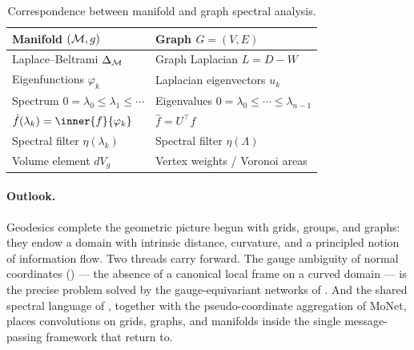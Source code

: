 \begin{table}[h]
\centering
\caption{Correspondence between manifold and graph spectral analysis.}
\label{tab:geo:analogy}
\begin{tabular}{@{}p{5.4cm}p{6.0cm}@{}}
\toprule
\textbf{Manifold $(\mathcal{M}, g)$} & \textbf{Graph $G = (V,E)$} \\
\midrule
Laplace--Beltrami $\Delta_{\mathcal{M}}$ & Graph Laplacian $L = D - W$ \\
\addlinespace
Eigenfunctions $\varphi_k$ & Laplacian eigenvectors $u_k$ \\
\addlinespace
Spectrum $0 = \lambda_0 \le \lambda_1 \le \cdots$ & Eigenvalues $0 = \lambda_0 \le \cdots \le \lambda_{n-1}$ \\
\addlinespace
$\hat f(\lambda_k) = \inner{f}{\varphi_k}$ & $\hat f = U^\top f$ \\
\addlinespace
Spectral filter $\eta(\lambda_k)$ & Spectral filter $\eta(\Lambda)$ \\
\addlinespace
Volume element $dV_g$ & Vertex weights / Voronoi areas \\
\bottomrule
\end{tabular}
\end{table}

\paragraph{Outlook.}
Geodesics complete the geometric picture begun with grids, groups, and graphs:
they endow a domain with intrinsic distance, curvature, and a principled notion
of information flow. Two threads carry forward. The gauge ambiguity of normal
coordinates () --- the absence of a canonical local frame on
a curved domain --- is the precise problem solved by the gauge-equivariant
networks of . And the shared spectral language of
, together with the pseudo-coordinate aggregation of
MoNet, places convolutions on grids, graphs, and manifolds inside the single
message-passing framework that  return to.
